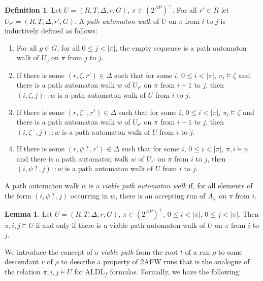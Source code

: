 \documentclass[10pt,a4paper]{amsart}
\theoremstyle{plain}
\theoremstyle{definition}
\newtheorem{lemma}[thm]{Lemma}
\newtheorem{definition}[thm]{Definition}
\theoremstyle{definition}
\DeclareMathOperator{\?}{?}
\begin{document}
\begin{definition}\label{def:path_automaton_walk}
    Let $U = (R,T,\Delta,r,G)$, $\pi \in (2^{AP})^+$. For all $r' \in R$ let $U_{r'} = (R,T,\Delta,r',G)$.
    A \textit{path automaton walk} of $U$ on $\pi$ from $i$ to $j$ is inductively defined as follows:
    \begin{enumerate}
        \item For all $g \in G$, for all $0 \leq j < |\pi|$, the empty sequence is a path automaton walk of $U_g$ on $\pi$ from $j$ to $j$.
        \item If there is some $(r,\zeta,r') \in \Delta$ such that for some $i$, $0 \leq i < |\pi|$, $\pi_i \models \zeta$ and there is a path automaton walk $w$
            of $U_{r'}$ on $\pi$ from $i+1$ to $j$, then $(i,\zeta,j) :: w$ is a path automaton walk of $U$ from $i$ to $j$.
        \item If there is some $(r,\zeta^-,r') \in \Delta$ such that for some $i$, $0 \leq i < |\pi|$, $\pi_i \models \zeta$ and there is a path automaton walk $w$
            of $U_{r'}$ on $\pi$ from $i-1$ to $j$, then $(i,\zeta^-,j) :: w$ is a path automaton walk of $U$ from $i$ to $j$.
        \item If there is some $(r,\psi \?,r') \in \Delta$ such that for some $i$, $0 \leq i < |\pi|$, $\pi,i \models \psi$ and there is a path automaton walk $w$
            of $U_{r'}$ on $\pi$ from $i$ to $j$, then $(i,\psi \? ,j) :: w$ is a path automaton walk of $U$ from $i$ to $j$.
    \end{enumerate}
    A path automaton walk $w$ is a \textit{viable path automaton walk} if, for all elements of the form $(i, \psi \? ,j)$
    occurring in $w$, there is an accepting run of $A_\psi$ on $\pi$ from $i$.

\end{definition}


\begin{lemma}\label{lem:walk_iff_relation}
    Let $U = (R,T,\Delta,r,G)$, $\pi \in (2^{AP})^+$, $0 \leq i < |\pi|$, $0 \leq j < |\pi|$. Then $\pi,i,j \models U$ if and only if
  there is a viable path automaton walk of $U$ on $\pi$ from $i$ to $j$.
\end{lemma}

We introduce the concept of a \textit{viable path} from the root $t$ of a run $\rho$
to some descendant $v$ of $\rho$ to describe a property of 2AFW runs that is the analogue
of the relation $\pi,i,j \models U$ for ALDL$_f$ formulas. Formally, we have the following:
\end{document}
